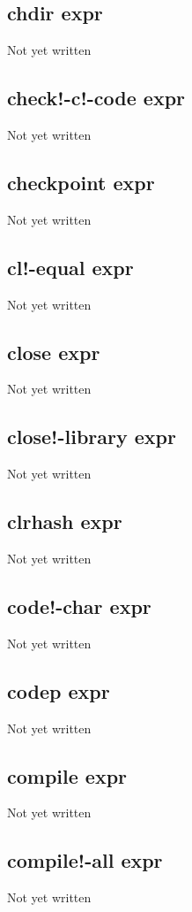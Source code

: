 \documentclass[a4paper,11pt]{article}
\begin{document}
{\subsection{\ttfamily chdir expr}
Not yet written

\subsection{\ttfamily check!-c!-code expr}
Not yet written

\subsection{\ttfamily checkpoint expr}
Not yet written

\subsection{\ttfamily cl!-equal expr}
Not yet written

\subsection{\ttfamily close expr}
Not yet written

\subsection{\ttfamily close!-library expr}
Not yet written

\subsection{\ttfamily clrhash expr}
Not yet written

\subsection{\ttfamily code!-char expr}
Not yet written

\subsection{\ttfamily codep expr}
Not yet written

\subsection{\ttfamily compile expr}
Not yet written

\subsection{\ttfamily compile!-all expr}
Not yet written

}
\end{document}
